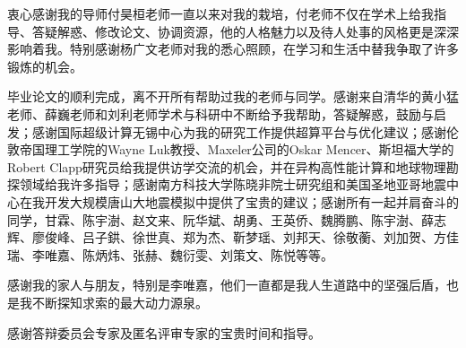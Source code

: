 \begin{acknowledgement}

衷心感谢我的导师付昊桓老师一直以来对我的栽培，付老师不仅在学术上给我指导、答疑解惑、修改论文、协调资源，他的人格魅力以及待人处事的风格更是深深影响着我。特别感谢杨广文老师对我的悉心照顾，在学习和生活中替我争取了许多锻炼的机会。

毕业论文的顺利完成，离不开所有帮助过我的老师与同学。感谢来自清华的黄小猛老师、薛巍老师和刘利老师学术与科研中不断给予我帮助，答疑解惑，鼓励与启发；感谢国际超级计算无锡中心为我的研究工作提供超算平台与优化建议；感谢伦敦帝国理工学院的Wayne Luk教授、Maxeler公司的Oskar Mencer、斯坦福大学的Robert Clapp研究员给我提供访学交流的机会，并在异构高性能计算和地球物理勘探领域给我许多指导；感谢南方科技大学陈晓非院士研究组和美国圣地亚哥地震中心在我开发大规模唐山大地震模拟中提供了宝贵的建议；感谢所有一起并肩奋斗的同学，甘霖、陈宇澍、赵文来、阮华斌、胡勇、王英侨、魏腾鹏、陈宇澍、薛志辉、廖俊峰、吕子鉷、徐世真、郑为杰、靳梦瑶、刘邦天、徐敬蘅、刘加贺、方佳瑞、李唯嘉、陈炳炜、张赫、魏衍雯、刘策文、陈悦等等。

感谢我的家人与朋友，特别是李唯嘉，他们一直都是我人生道路中的坚强后盾，也是我不断探知求索的最大动力源泉。

感谢答辩委员会专家及匿名评审专家的宝贵时间和指导。
\end{acknowledgement}
